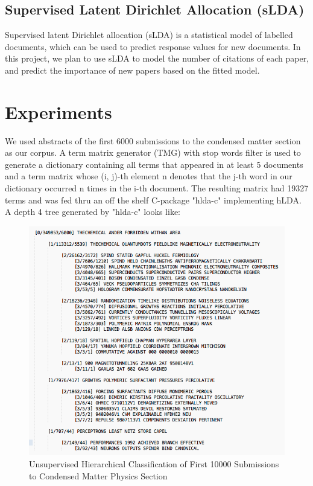 \documentclass[DIV=calc, paper=a4, fontsize=11pt, twocolumn]{scrartcl}	 %
\begin{document}
\subsection*{Supervised Latent Dirichlet Allocation (sLDA)}
Supervised latent Dirichlet allocation (sLDA) is a statistical model of labelled documents, which can be used to predict response values for new documents. In this project, we plan to use sLDA to model the number of citations of each paper, and predict the importance of new papers based on the fitted model.
\section*{Experiments}

We used abstracts of the first 6000 submissions to the condensed matter section as our corpus. A term matrix generator (TMG) \cite{3} with stop words filter is used to generate a dictionary containing all terms that appeared in at least 5 documents and a term matrix whose (i, j)-th element n denotes that the j-th word in our dictionary occurred n times in the i-th document. The resulting matrix had 19327 terms and was fed thru an off the shelf C-package "hlda-c" \cite{1} implementing hLDA.\\
A depth 4 tree generated by "hlda-c" looks like:\newline
			\begin{figure}[!ht]
				\centerline{\includegraphics[scale = 0.35]{tree10000.png}}
				\caption{Unsupervised Hierarchical Classification of First 10000 Submissions to Condensed Matter Physics Section}
			\end{figure}
\end{document}
